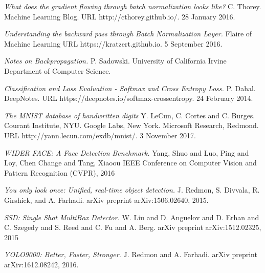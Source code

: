 \documentclass[a4paper, twoside]{article}
\begin{document}
\begin{thebibliography}{99}
	
	

	
	\textit{What does the gradient flowing through batch normalization looks like?}
	C. Thorey.
    Machine Learning Blog. 
    URL http://cthorey.github.io/.
	28 January 2016.
	
	

	
	\textit{Understanding the backward pass through Batch Normalization Layer.}
	Flaire of Machine Learning
    URL https://kratzert.github.io.
	5 September 2016.

	\textit{Notes on Backpropagation.}
    P. Sadowski.
    University of California Irvine	Department of Computer Science.
    


	
	\textit{Classification and Loss Evaluation - Softmax and Cross Entropy Loss.}
	P. Dahal. 
	DeepNotes.
    URL https://deepnotes.io/softmax-crossentropy.
	24 February 2014.
	
	\textit{The MNIST database of handwritten digits}
	Y. LeCun, C. Cortes and C. Burges. Courant Institute, NYU. Google Labs, New York. Microsoft Research, Redmond. 
	URL http://yann.lecun.com/exdb/mnist/.
	3 November 2017.
	
	
	
    
	\textit{WIDER FACE: A Face Detection Benchmark.}
	Yang, Shuo and Luo, Ping and Loy, Chen Change and Tang, Xiaoou
    IEEE Conference on Computer Vision and Pattern Recognition (CVPR), 2016
    
    
    
    

    
	\textit{You only look once: Unified, real-time object detection.}
    J. Redmon, S. Divvala, R. Girshick, and A. Farhadi. 
    arXiv preprint arXiv:1506.02640, 2015.
    
    
    
	\textit{{SSD:} Single Shot MultiBox Detector.}
	W. Liu and
               D. Anguelov and
               D. Erhan and
               C. Szegedy and
               S. Reed and
               C. Fu and
               A. Berg.
    arXiv preprint arXiv:1512.02325, 2015


    
	\textit{{YOLO9000:} Better, Faster, Stronger.}
    J. Redmon and
               A. Farhadi. 
    arXiv preprint arXiv:1612.08242, 2016.
    
    
    

\end{thebibliography}
\end{document}
